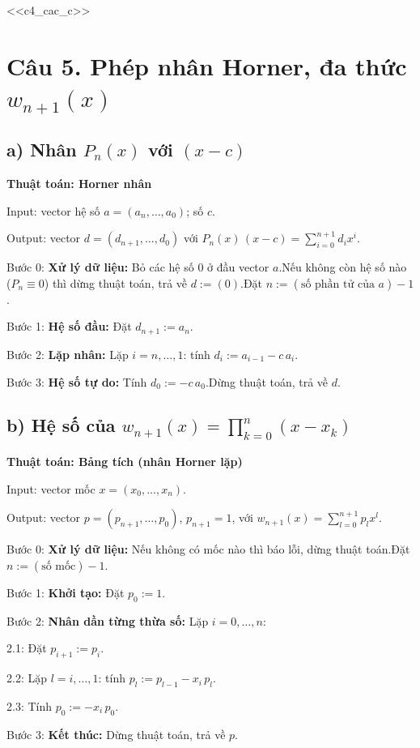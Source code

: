 \documentclass[11pt,a4paper]{article}
\newenvironment{thuattoan}[1]
  {\par\medskip\noindent\textbf{Thuật toán: #1}\begin{description}[style=standard,align=left,leftmargin=4.3em,labelwidth=3.9em,labelsep=0.4em,itemsep=1pt,topsep=3pt,font=\normalfont\bfseries]}
  {\end{description}}
\newenvironment{con}
  {\begin{description}[style=standard,align=left,leftmargin=2.1em,labelwidth=1.8em,labelsep=0.3em,itemsep=0pt,topsep=1pt,font=\normalfont]}
  {\end{description}}
\begin{document}
<<c4_cac_c>>

\section{Câu 5. Phép nhân Horner, đa thức $w_{n+1}(x)$}

\subsection{a) Nhân $P_n(x)$ với $(x-c)$}
\begin{thuattoan}{Horner nhân}
\item[Input:] vector hệ số $a=(a_n,\dots,a_0)$; số $c$.
\item[Output:] vector $d=(d_{n+1},\dots,d_0)$ với $P_n(x)\,(x-c)=\sum_{i=0}^{n+1}d_ix^i$.
\item[Bước 0:] \textbf{Xử lý dữ liệu:} Bỏ các hệ số $0$ ở đầu vector $a$.\newline Nếu không còn hệ số nào ($P_n\equiv0$) thì dừng thuật toán, trả về $d:=(0)$.\newline Đặt $n:=(\text{số phần tử của }a)-1$.
\item[Bước 1:] \textbf{Hệ số đầu:} Đặt $d_{n+1}:=a_n$.
\item[Bước 2:] \textbf{Lặp nhân:} Lặp $i=n,\dots,1$: tính $d_i:=a_{i-1}-c\,a_i$.
\item[Bước 3:] \textbf{Hệ số tự do:} Tính $d_0:=-c\,a_0$.\newline Dừng thuật toán, trả về $d$.
\end{thuattoan}

\subsection{b) Hệ số của $w_{n+1}(x)=\prod_{k=0}^{n}(x-x_k)$}
\begin{thuattoan}{Bảng tích (nhân Horner lặp)}
\item[Input:] vector mốc $x=(x_0,\dots,x_n)$.
\item[Output:] vector $p=(p_{n+1},\dots,p_0)$, $p_{n+1}=1$, với $w_{n+1}(x)=\sum_{l=0}^{n+1}p_lx^l$.
\item[Bước 0:] \textbf{Xử lý dữ liệu:} Nếu không có mốc nào thì báo lỗi, dừng thuật toán.\newline Đặt $n:=(\text{số mốc})-1$.
\item[Bước 1:] \textbf{Khởi tạo:} Đặt $p_0:=1$.
\item[Bước 2:] \textbf{Nhân dần từng thừa số:} Lặp $i=0,\dots,n$:
  \begin{con}
  \item[2.1:] Đặt $p_{i+1}:=p_i$.
  \item[2.2:] Lặp $l=i,\dots,1$: tính $p_l:=p_{l-1}-x_i\,p_l$.
  \item[2.3:] Tính $p_0:=-x_i\,p_0$.
  \end{con}
\item[Bước 3:] \textbf{Kết thúc:} Dừng thuật toán, trả về $p$.
\end{thuattoan}
\end{document}
